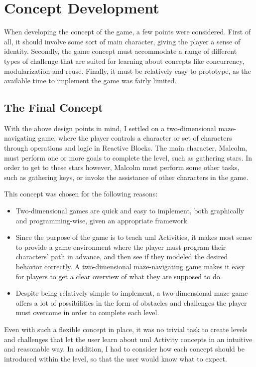 \section{Concept Development}
\label{sec:game_concept}
When developing the concept of the game, a few points were considered. First of all, it should involve some sort of main character, giving the player a sense of identity. Secondly, the game concept must accommodate a range of different types of challenge that are suited for learning about concepts like concurrency, modularization and reuse. Finally, it must be relatively easy to prototype, as the available time to implement the game was fairly limited.

\subsection{The Final Concept}
\label{sec:game_final_concept}
With the above design points in mind, I settled on a two-dimensional maze-navigating game, where the player controls a character or set of characters through operations and logic in Reactive Blocks. The main character, Malcolm, must perform one or more goals to complete the level, such as gathering stars. In order to get to these stars however, Malcolm must perform some other tasks, such as gathering keys, or invoke the assistance of other characters in the game.

\noindent
This concept was chosen for the following reasons:
\begin{itemize}
	\item Two-dimensional games are quick and easy to implement, both graphically and programming-wise, given an appropriate framework.
	\item Since the purpose of the game is to teach \gls{uml} Activities, it makes most sense to provide a game environment where the player must program their characters' path in advance, and then see if they modeled the desired behavior correctly. A two-dimensional maze-navigating game makes it easy for players to get a clear overview of what they are supposed to do.
	\item Despite being relatively simple to implement, a two-dimensional maze-game offers a lot of possibilities in the form of obstacles and challenges the player must overcome in order to complete each level.
\end{itemize}

\noindent
Even with such a flexible concept in place, it was no trivial task to create levels and challenges that let the user learn about \gls{uml} Activity concepts in an intuitive and reasonable way. In addition, I had to consider how each concept should be introduced within the level, so that the user would know what to expect.


